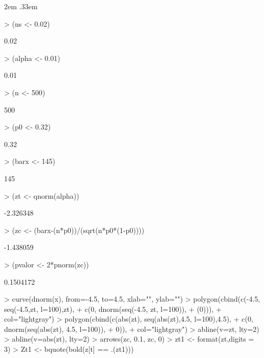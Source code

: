 \documentclass{article}
\newenvironment{ManualExercise}
  {\begin{list}{}{\leftmargin \QuestionIndent
    \partopsep0pt \parsep\parskip \topsep\QuestionBefore
    \itemsep\QuestionBefore \labelwidth2em
    \labelsep.33em
    \usecounter{Question}}}
  {\end{list}}
\begin{document}
\begin{Exercise}
\begin{ManualExercise}
\begin{Schunk}
\begin{Sinput}
> (ns <- 0.02)
\end{Sinput}
\begin{Soutput}
[1] 0.02
\end{Soutput}
\begin{Sinput}
> (alpha <- 0.01)
\end{Sinput}
\begin{Soutput}
[1] 0.01
\end{Soutput}
\begin{Sinput}
> (n <- 500)
\end{Sinput}
\begin{Soutput}
[1] 500
\end{Soutput}
\begin{Sinput}
> (p0 <- 0.32)
\end{Sinput}
\begin{Soutput}
[1] 0.32
\end{Soutput}
\begin{Sinput}
> (barx <- 145)
\end{Sinput}
\begin{Soutput}
[1] 145
\end{Soutput}
\begin{Sinput}
> (zt <- qnorm(alpha))
\end{Sinput}
\begin{Soutput}
[1] -2.326348
\end{Soutput}
\begin{Sinput}
> (zc <- (barx-(n*p0))/(sqrt(n*p0*(1-p0))))
\end{Sinput}
\begin{Soutput}
[1] -1.438059
\end{Soutput}
\begin{Sinput}
> (pvalor <- 2*pnorm(zc))
\end{Sinput}
\begin{Soutput}
[1] 0.1504172
\end{Soutput}
\begin{Sinput}
> curve(dnorm(x), from=-4.5, to=4.5, xlab="", ylab="")
> polygon(cbind(c(-4.5, seq(-4.5,zt, l=100),zt),
+               c(0, dnorm(seq(-4.5, zt, l=100)),
+                 (0))),
+         col="lightgray")
> polygon(cbind(c(abs(zt), seq(abs(zt),4.5, l=100),4.5),
+               c(0, dnorm(seq(abs(zt), 4.5, l=100)),
+                 0)),
+         col="lightgray")
> abline(v=zt, lty=2)
> abline(v=abs(zt), lty=2)
> arrows(zc, 0.1, zc, 0)
> zt1 <- format(zt,digits = 3)
> Zt1 <- bquote(bold(z[t] == .(zt1)))

\end{Sinput}
\end{Schunk}
\end{ManualExercise}
\end{Exercise}
\end{document}
